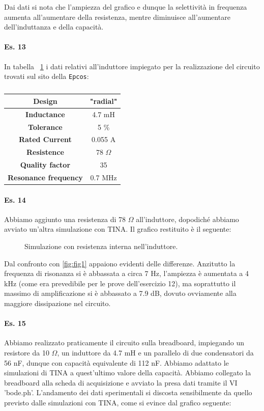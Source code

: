 \documentclass[journal, a4paper]{IEEEtran}
\begin{document}
Dai dati si nota che l'ampiezza del grafico e dunque la selettività in frequenza aumenta all'aumentare della resistenza, mentre diminuisce all'aumentare dell'induttanza e della capacità.

\paragraph{Es. 13}
In tabella ~\ref{tab:tab2} i dati relativi all'induttore impiegato per la realizzazione del circuito trovati sul sito della \texttt{Epcos}:

\begin{table}[htp]
\caption{}
\label{tab:tab2}
\centering
\begin{tabular}{c|c}
\hline
\textbf{Design} & "radial"\\
\hline
\textbf{Inductance} & 4.7 mH\\
\hline
\textbf{Tolerance} & 5 \% \\
\hline
\textbf{Rated Current} & 0.055 A\\
\hline
\textbf{Resistence} & 78 $\Omega$\\
\hline
\textbf{Quality factor} & 35\\
\hline
\textbf{Resonance frequency} & 0.7 MHz\\
\hline
\end{tabular}
\end{table}

\paragraph{Es. 14}

Abbiamo aggiunto una resistenza di 78 $\Omega$ all'induttore, dopodiché abbiamo avviato un'altra simulazione con TINA. Il grafico restituito è il seguente:
\begin{figure}[htbp]
\centering
\caption{Simulazione con resistenza interna nell'induttore.}
\end{figure}

Dal confronto con \ref{fig:fig1} appaiono evidenti delle differenze. Anzitutto la frequenza di risonanza si è abbassata a circa 7 Hz, l'ampiezza è aumentata a 4 kHz (come era prevedibile per le prove dell'esercizio 12), ma soprattutto il massimo di amplificazione si è abbassato a 7.9 dB, dovuto ovviamente alla maggiore dissipazione nel circuito.

\paragraph{Es. 15}
Abbiamo realizzato praticamente il circuito sulla breadboard, impiegando un resistore da 10 $\Omega$, un induttore da 4.7 mH e un parallelo di due condensatori da 56 nF, dunque con capacità equivalente di 112 nF. Abbiamo adattato le simulazioni di TINA a quest'ultimo valore della capacità. Abbiamo collegato la breadboard alla scheda di acquisizione e avviato la presa dati tramite il VI 'bode.ph'. L'andamento dei dati sperimentali si discosta sensibilmente da quello previsto dalle simulazioni con TINA, come si evince dal grafico seguente:
\end{document}
